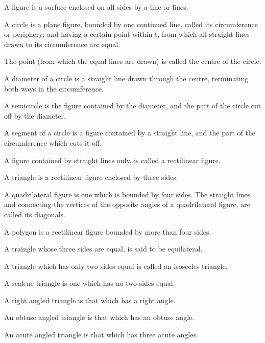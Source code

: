 \begin{bizarrelist}
			\item A figure is a surface enclosed on all sides by a line or lines.         \label{def14}
			\item A circle is a plane figure, bounded by one continued line, called its circumference or periphery; and having a certain point within t, from which all straight lines drawn to its circumference are equal.          \label{def15}
			\item The point (from which the equal lines are drawn) is called the centre of the circle.           \label{def16}
			\item A diameter of a circle is a straight line drawn through the centre, terminating both ways in the circumference.            \label{def17}
			\item A semicircle is the figure contained by the diameter, and the part of the circle cut off by the diameter.            \label{def18}
			\item A segment of a circle is a figure contained by a straight line, and the part of the circumference which cuts it off.             \label{def19}
			\item A figure contained by straight lines only, is called a rectilinear figure.              \label{def20}
			\item A triangle is a rectilinear figure enclosed by three sides.               \label{def21}
			\item A quadrilateral figure is one which is bounded by four sides. The straight lines and connecting the vertices of the opposite angles of a quadrilateral figure, are called its diagonals.                \label{def22}
			\item A polygon is a rectilinear figure bounded by more than four sides.                 \label{def23}
			\item A traingle whose three sides are equal, is said to be equilateral.                  \label{def24}
			\item A triangle which has only two sides equal is called an isosceles triangle.                   \label{def25}
			\item A scalene triangle is one which has no two sides equal.                    \label{def26}
			\item A right angled triangle is that which has a right angle.                     \label{def27}
			\item An obtuse angled triangle is that which has an obtuse angle.                      \label{def28}
			\item An acute angled triangle is that which has three acute angles.                       \label{def29}

\end{bizarrelist}
